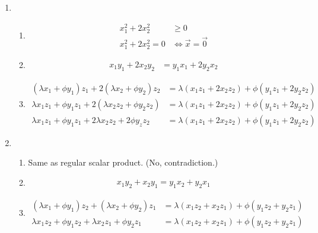 \documentclass{article}
\begin{document}
\begin{enumerate}
    \item \begin{enumerate}[label=(\roman*)]
        \item \begin{align*}
            x_1^2 + 2x_2^2 &\geq 0 \\
            x_1^2 + 2x_2^2 = 0 &\Leftrightarrow \vec{x} = \vec{0}
        \end{align*}

        \item \begin{align*}
            x_1y_1 + 2x_2y_2 & = y_1x_1 + 2y_2x_2
        \end{align*}

        \item \begin{align*}
            (\lambda x_1 + \phi y_1)z_1 + 2(\lambda x_2 + \phi y_2)z_2 &= \lambda(x_1z_1 + 2x_2z_2) + \phi(y_1z_1 + 2y_2z_2) \\
        \lambda x_1 z_1 + \phi y_1 z_1 + 2(\lambda x_2 z_2 + \phi y_2z_2) &= \lambda(x_1z_1 + 2x_2z_2) + \phi(y_1z_1 + 2y_2z_2) \\
        \lambda x_1 z_1 + \phi y_1 z_1 + 2\lambda x_2 z_2 + 2\phi y_z z_2 &= \lambda(x_1z_1 + 2x_2z_2) + \phi(y_1z_1 + 2y_2z_2)
        \end{align*}
    \end{enumerate}

    \item \begin{enumerate}[label=(\roman*)]
        \item Same as regular scalar product. (No, contradiction.)
        
        \item \begin{align*}
            x_1y_2 + x_2y_1 = y_1x_2 + y_2x_1
        \end{align*}

        \item \begin{align*}
            (\lambda x_1 + \phi y_1)z_2 + (\lambda x_2 + \phi y_2)z_1 &= \lambda(x_1z_2 + x_2z_1) + \phi(y_1z_2 + y_2z_1) \\
            \lambda x_1 z_2 + \phi y_1 z_2 + \lambda x_2 z_1 + \phi y_2 z_1 &= \lambda(x_1z_2 + x_2z_1) + \phi(y_1z_2 + y_2z_1)
        \end{align*}
    \end{enumerate}


\end{enumerate}
\end{document}
